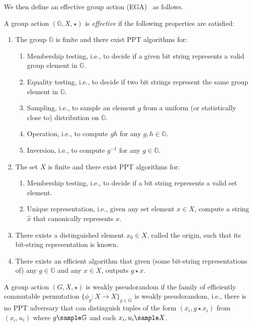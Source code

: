 \documentclass[a4paper,10pt]{article}
\begin{document}
We then define an effective group action (EGA)~\cite{AFMP-ASIACRYPT-2020} as follows. 
\begin{definition}
A group action $(\mathbb{G}, X, \star)$ is \emph{effective} if the following properties are satisfied:  
\begin{enumerate}
\item The group $\mathbb{G}$ is finite and there exist PPT algorithms for: 
\begin{enumerate}
    \item Membership testing, i.e., to decide if a given bit string represents a valid group element in $\mathbb{G}$. 
    \item Equality testing, i.e., to decide if two bit strings represent the same group element in $\mathbb{G}$.
    \item Sampling, i.e., to sample an element $g$ from a uniform (or statistically close to) distribution on $\mathbb{G}$.  
    \item Operation, i.e., to compute $gh$ for any $g, h \in \mathbb{G}$. 
    \item Inversion, i.e., to compute $g^{-1}$ for any $g \in \mathbb{G}$.
\end{enumerate}

\item The set $X$ is finite and there exist PPT algorithms for: 
\begin{enumerate}
    \item Membership testing, i.e., to decide if a bit string represents a valid set element. 

    \item Unique representation, i.e., given any set element $x \in X$, 
        compute a string $\hat{x}$ that canonically represents $x$.
\end{enumerate}

\item There exists a distinguished element $x_0 \in X$, 
    called the origin, such that its bit-string representation is known.

\item There exists an efficient algorithm that given (some bit-string representations of) any $g \in \mathbb{G}$ 
    and any $x \in X$, outputs $g \star x$.
\end{enumerate} 
\end{definition}

\begin{definition}
A group action $(G, X, \star)$ is weakly pseudorandom if the family of efficiently commutable permutation 
$\{\phi_g: X \rightarrow X\}_{g \in G}$ is weakly pseudorandom, i.e., 
there is no PPT adversary that can distinguish tuples of the form $(x_i, g \star x_i)$ 
from $(x_i, u_i)$ where $g \sample \mathbb{G}$ and each $x_i, u_i \sample X$.
\end{definition}
\end{document}
